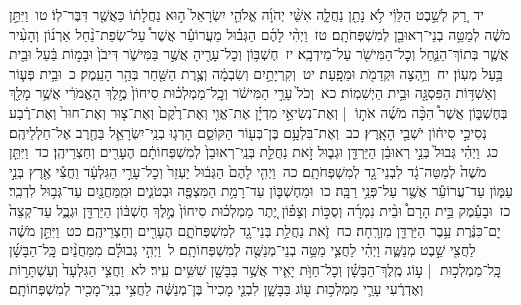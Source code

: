 \documentclass[18pt]{article}
\begin{document}
 {\loc יד~}רַ֚ק לְשֵׁ֣בֶט הַלֵּוִ֔י לֹ֥א נָתַ֖ן נַחֲלָ֑ה אִשֵּׁ֨י יְהֹוָ֜ה אֱלֹהֵ֤י יִשְׂרָאֵל֙ ה֣וּא נַחֲלָת֔וֹ כַּאֲשֶׁ֖ר דִּבֶּר־לֽוֹ׃ \startlock
 {\loc טו~}וַיִּתֵּ֣ן מֹשֶׁ֔ה לְמַטֵּ֥ה בְנֵי־רְאוּבֵ֖ן לְמִשְׁפְּחֹתָֽם׃ \startlock
 {\loc טז~}וַיְהִ֨י לָהֶ֜ם הַגְּב֗וּל מֵעֲרוֹעֵ֡ר אֲשֶׁר֩ עַל־שְׂפַת־נַ֨חַל אַרְנ֜וֹן וְהָעִ֨יר אֲשֶׁ֧ר בְּתוֹךְ־הַנַּ֛חַל וְכׇל־הַמִּישֹׁ֖ר עַל־מֵידְבָֽא׃ \startlock
 {\loc יז~}חֶשְׁבּ֥וֹן וְכׇל־עָרֶ֖יהָ אֲשֶׁ֣ר בַּמִּישֹׁ֑ר דִּיבֹן֙ וּבָמ֣וֹת בַּ֔עַל וּבֵ֖ית בַּ֥עַל מְעֽוֹן׃ \startlock
 {\loc יח~}וְיַ֥הְצָה וּקְדֵמֹ֖ת וּמֵפָֽעַת׃ \startlock
 {\loc יט~}וְקִרְיָתַ֣יִם וְשִׂבְמָ֔ה וְצֶ֥רֶת הַשַּׁ֖חַר בְּהַ֥ר הָעֵֽמֶק׃ \startlock
 {\loc כ~}וּבֵ֥ית פְּע֛וֹר וְאַשְׁדּ֥וֹת הַפִּסְגָּ֖ה וּבֵ֥ית הַיְשִׁמֽוֹת׃ \startlock
 {\loc כא~}וְכֹל֙ עָרֵ֣י הַמִּישֹׁ֔ר וְכׇֽל־מַמְלְכ֗וּת סִיחוֹן֙ מֶ֣לֶךְ הָאֱמֹרִ֔י אֲשֶׁ֥ר מָלַ֖ךְ בְּחֶשְׁבּ֑וֹן אֲשֶׁר֩ הִכָּ֨ה מֹשֶׁ֜ה אֹת֣וֹ  |  וְאֶת־נְשִׂיאֵ֣י מִדְיָ֗ן אֶת־אֱוִ֤י וְאֶת־רֶ֙קֶם֙ וְאֶת־צ֤וּר וְאֶת־חוּר֙ וְאֶת־רֶ֔בַע נְסִיכֵ֣י סִיח֔וֹן יֹשְׁבֵ֖י הָאָֽרֶץ׃ \startlock
 {\loc כב~}וְאֶת־בִּלְעָ֥ם בֶּן־בְּע֖וֹר הַקּוֹסֵ֑ם הָרְג֧וּ בְנֵֽי־יִשְׂרָאֵ֛ל בַּחֶ֖רֶב אֶל־חַלְלֵיהֶֽם׃ \startlock
 {\loc כג~}וַיְהִ֗י גְּבוּל֙ בְּנֵ֣י רְאוּבֵ֔ן הַיַּרְדֵּ֖ן וּגְב֑וּל זֹ֣את נַחֲלַ֤ת בְּנֵֽי־רְאוּבֵן֙ לְמִשְׁפְּחוֹתָ֔ם הֶעָרִ֖ים וְחַצְרֵיהֶֽן׃ \startlock
 {\loc כד~}וַיִּתֵּ֤ן מֹשֶׁה֙ לְמַטֵּה־גָ֔ד לִבְנֵי־גָ֖ד לְמִשְׁפְּחֹתָֽם׃ \startlock
 {\loc כה~}וַיְהִ֤י לָהֶם֙ הַגְּב֔וּל יַעְזֵר֙ וְכׇל־עָרֵ֣י הַגִּלְעָ֔ד וַחֲצִ֕י אֶ֖רֶץ בְּנֵ֣י עַמּ֑וֹן עַד־עֲרוֹעֵ֕ר אֲשֶׁ֖ר עַל־פְּנֵ֥י רַבָּֽה׃ \startlock
 {\loc כו~}וּמֵחֶשְׁבּ֛וֹן עַד־רָמַ֥ת הַמִּצְפֶּ֖ה וּבְטֹנִ֑ים וּמִֽמַּחֲנַ֖יִם עַד־גְּב֥וּל לִדְבִֽר׃ \startlock
 {\loc כז~}וּבָעֵ֡מֶק בֵּ֣ית הָרָם֩ וּבֵ֨ית נִמְרָ֜ה וְסֻכּ֣וֹת וְצָפ֗וֹן יֶ֚תֶר מַמְלְכ֗וּת סִיחוֹן֙ מֶ֣לֶךְ חֶשְׁבּ֔וֹן הַיַּרְדֵּ֖ן וּגְבֻ֑ל עַד־קְצֵה֙ יָם־כִּנֶּ֔רֶת עֵ֥בֶר הַיַּרְדֵּ֖ן מִזְרָֽחָה׃ \startlock
 {\loc כח~}זֹ֛את נַחֲלַ֥ת בְּנֵי־גָ֖ד לְמִשְׁפְּחֹתָ֑ם הֶעָרִ֖ים וְחַצְרֵיהֶֽם׃ \startlock
 {\loc כט~}וַיִּתֵּ֣ן מֹשֶׁ֔ה לַחֲצִ֖י שֵׁ֣בֶט מְנַשֶּׁ֑ה וַיְהִ֗י לַחֲצִ֛י מַטֵּ֥ה בְנֵי־מְנַשֶּׁ֖ה לְמִשְׁפְּחוֹתָֽם׃ \startlock
 {\loc ל~}וַיְהִ֣י גְבוּלָ֗ם מִמַּחֲנַ֨יִם כׇּֽל־הַבָּשָׁ֜ן כׇּֽל־מַמְלְכ֣וּת  |  ע֣וֹג מֶֽלֶךְ־הַבָּשָׁ֗ן וְכׇל־חַוֺּ֥ת יָאִ֛יר אֲשֶׁ֥ר בַּבָּשָׁ֖ן שִׁשִּׁ֥ים עִֽיר׃ \startlock
 {\loc לא~}וַחֲצִ֤י הַגִּלְעָד֙ וְעַשְׁתָּר֣וֹת וְאֶדְרֶ֔עִי עָרֵ֛י מַמְלְכ֥וּת ע֖וֹג בַּבָּשָׁ֑ן לִבְנֵ֤י מָכִיר֙ בֶּן־מְנַשֶּׁ֔ה לַחֲצִ֥י בְנֵֽי־מָכִ֖יר לְמִשְׁפְּחוֹתָֽם׃ \startlock
\end{document}
